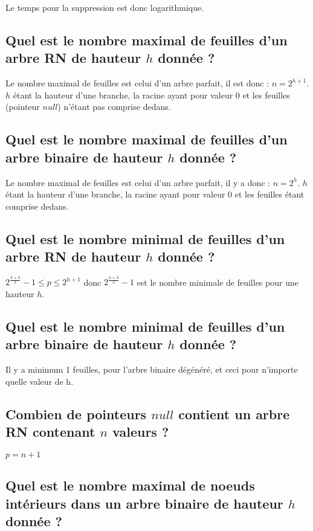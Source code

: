 \documentclass[11pt]{article}
\begin{document}
Le temps pour la suppression est donc logarithmique.

\subsection{Quel est le nombre maximal de feuilles d'un arbre RN de hauteur $h$ donnée ?}

Le nombre maximal de feuilles est celui d'un arbre parfait, il est donc : $n = 2^{h+1}$. $h$ étant la hauteur d'une branche, la racine ayant pour valeur 0 et les feuilles (pointeur $null$) n'étant pas comprise dedans.

\subsection{Quel est le nombre maximal de feuilles d'un arbre binaire de hauteur $h$ donnée ?}

Le nombre maximal de feuilles est celui d'un arbre parfait, il y a donc : $n = 2^h$. $h$ étant la hauteur d'une branche, la racine ayant pour valeur 0 et les feuilles étant comprise dedans.

\subsection{Quel est le nombre minimal de feuilles d'un arbre RN de hauteur $h$ donnée ?}

$2^{\frac{h+3}{2}} - 1 \leq p \leq 2^{h+1}$ donc $2^{\frac{h+3}{2}} - 1$ est le nombre minimale de feuilles pour une hauteur $h$.

\subsection{Quel est le nombre minimal de feuilles d'un arbre binaire de hauteur $h$ donnée ?}

Il y a minimum 1 feuilles, pour l'arbre binaire dégénéré, et ceci pour n'importe quelle valeur de h. 

\subsection{Combien de pointeurs $null$ contient un arbre RN contenant $n$ valeurs ?}

$p = n + 1$

\subsection{Quel est le nombre maximal de noeuds intérieurs dans un arbre binaire de hauteur $h$ donnée ?}
\end{document}
